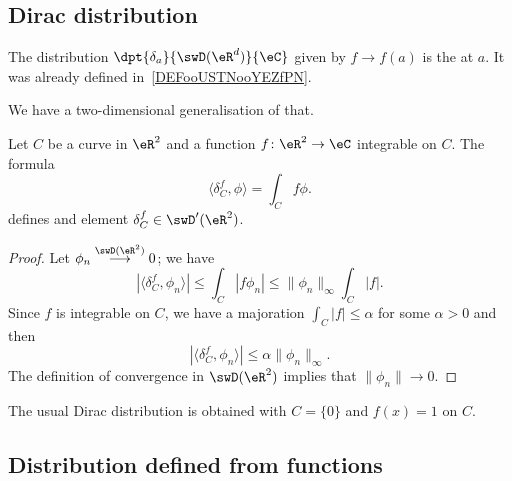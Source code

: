 \subsection{Dirac distribution}

The distribution $\dpt{\delta_a}{\swD(\eR^d)}{\eC}$ given by $f\to f(a)$ is the  at $a$. It was already defined in~\ref{DEFooUSTNooYEZfPN}.

We have a two-dimensional generalisation of that.

\begin{lemmaDef}        \label{LEMooYABKooWPXIXZ}
	Let \( C\) be a curve in \( \eR^2\) and a function \( f\colon \eR^2\to \eC\) integrable on \( C\). The formula
	\begin{equation}
		\langle \delta_C^f, \phi\rangle =\int_Cf\phi.
	\end{equation}
	defines and element \( \delta_C^f\in \swD'(\eR^2) \).
\end{lemmaDef}

\begin{proof}
	Let \( \phi_n\stackrel{\swD(\eR^2)}{\longrightarrow}0\); we have
	\begin{equation}
		|\langle \delta_C^{f}, \phi_n\rangle |\leq\int_C|f\phi_n|\leq  \| \phi_n \|_{\infty}   \int_C| f |.
	\end{equation}
	Since \( f\) is integrable on \( C\), we have a majoration \( \int_C| f |\leq \alpha\) for some \( \alpha>0\) and then
	\begin{equation}
		|\langle \delta_C^{f}, \phi_n\rangle |\leq \alpha\| \phi_n \|_{\infty}.
	\end{equation}
	The definition of convergence in \( \swD(\eR^2)\) implies that \( \| \phi_n \|\to 0\).
\end{proof}

The usual Dirac distribution is obtained with \( C=\{ 0 \}\) and \( f(x)=1\) on $C$.

\subsection{Distribution defined from functions}

